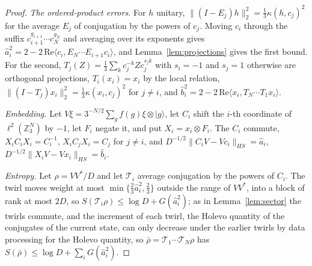 \documentclass[11pt,a4paper]{article}
\theoremstyle{plain}
\theoremstyle{definition}
\theoremstyle{remark}
\begin{document}
\begin{proof}
\emph{The ordered-product errors.} For $h$ unitary, $\|(I-E_j)h\|_2^2=\frac13\kappa(h,c_j)^2$ for the average $E_j$ of conjugation by the
powers of $c_j$. Moving $c_i$ through the suffix $c_{i+1}^{g_{i+1}}\cdots c_N^{g_N}$ and averaging over its exponents gives
$\hat a_i^2=2-2\,\mathrm{Re}\langle c_i,E_N\cdots E_{i+1}c_i\rangle$, and Lemma~\ref{lem:projections} gives the first bound. For the second,
$T_j(Z)=\frac13\sum_kc_j^{-k}Zc_j^{s_jk}$ with $s_i=-1$ and $s_j=1$ otherwise are orthogonal projections, $T_i(x_i)=x_i$ by the local
relation, $\|(I-T_j)x_i\|_2^2=\frac13\kappa(x_i,c_j)^2$ for $j\ne i$, and $\hat b_i^2=2-2\,\mathrm{Re}\langle x_i,T_N\cdots T_1x_i\rangle$.

\emph{Embedding.} Let $V\xi=3^{-N/2}\sum_gf(g)\xi\otimes|g\rangle$, let $C_i$ shift the $i$-th coordinate of $\ell^2(\mathbb Z_3^N)$ by $-1$, let
$F_i$ negate it, and put $X_i=x_i\otimes F_i$. The $C_i$ commute, $X_iC_iX_i=C_i^{-1}$, $X_iC_jX_i=C_j$ for $j\ne i$, and
$D^{-1/2}\|C_iV-Vc_i\|_{HS}=\hat a_i$, $D^{-1/2}\|X_iV-Vx_i\|_{HS}=\hat b_i$.

\emph{Entropy.} Let $\rho=VV^*/D$ and let $\mathcal T_i$ average conjugation by the powers of $C_i$. The twirl moves weight at most
$\min\{\frac23\hat a_i^2,\frac23\}$ outside the range of $VV^*$, into a block of rank at most $2D$, so $S(\mathcal T_i\rho)\le\log D+G(\hat a_i^2)$; as in
Lemma~\ref{lem:sector} the twirls commute, and the increment of each twirl, the Holevo quantity of the conjugates of the current
state, can only decrease under the earlier twirls by data processing for the Holevo quantity, so $\bar\rho=\mathcal T_1\cdots\mathcal T_N\rho$ has
$S(\bar\rho)\le\log D+\sum_iG(\hat a_i^2)$.


\end{proof}
\end{document}
